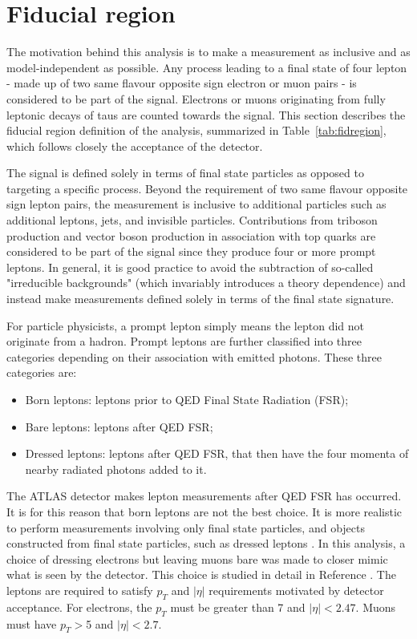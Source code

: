 \section{Fiducial region}
\label{sec:signaldef}
The motivation behind this analysis is to make a measurement as inclusive and as model-independent as possible. Any process leading to a final state of four lepton - made up of two same flavour opposite sign electron or muon pairs - is considered to be part of the signal. Electrons or muons originating from fully leptonic decays of taus are counted towards the signal. This section describes the fiducial region definition of the analysis, summarized in Table~\ref{tab:fidregion}, which follows closely the acceptance of the detector. 

The signal is defined solely in terms of final state particles as opposed to targeting a specific process. Beyond the requirement of two same flavour opposite sign lepton pairs, the measurement is inclusive to additional particles such as additional leptons, jets, and invisible particles. Contributions from triboson production and vector boson production in association with top quarks are considered to be part of the signal since they produce four or more prompt leptons. In general, it is good practice to avoid the subtraction of so-called "irreducible backgrounds" (which invariably introduces a theory dependence) and instead make measurements defined solely in terms of the final state signature. 

For particle physicists, a prompt lepton simply means the lepton did not originate from a hadron. Prompt leptons are further classified into three categories depending on their association with emitted photons. These three categories are:
\begin{itemize}
    \item Born leptons: leptons prior to QED Final State Radiation (FSR);
    \item Bare leptons: leptons after QED FSR;
    \item Dressed leptons: leptons after QED FSR, that then have the four momenta of nearby radiated photons added to it. 
\end{itemize}
The ATLAS detector makes lepton measurements after QED FSR has occurred. It is for this reason that born leptons are not the best choice. It is more realistic to perform measurements involving only final state particles, and objects constructed from final state particles, such as dressed leptons \cite{Kar:ab1be6}. In this analysis, a choice of dressing electrons but leaving muons bare was made to closer mimic what is seen by the detector. This choice is studied in detail in Reference \cite{m4l_internalnote}. The leptons are required to satisfy $p_T$ and $|\eta|$ requirements motivated by detector acceptance. For electrons, the $p_T$ must be greater than \unit{7}{\GeV} and $|\eta|<2.47$. Muons must have $p_T > $\unit{5}{\GeV} and $|\eta|<2.7$.

